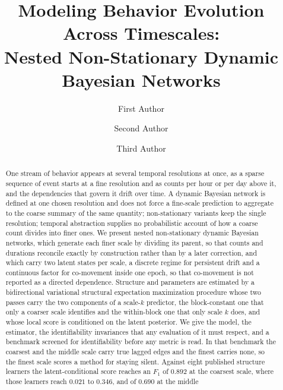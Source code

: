 \documentclass[letterpaper,10pt]{article}
\begin{document}
\title{
    Modeling Behavior Evolution Across Timescales:\\
    Nested Non-Stationary Dynamic Bayesian Networks
}

\author[1,$*$,$\dagger$]{First Author}
\author[1,2,$*$]{Second Author}
\author[2]{Third Author}


\maketitle

\begin{abstract}
One stream of behavior appears at several temporal resolutions at once, as a
sparse sequence of event starts at a fine resolution and as counts per hour or
per day above it, and the dependencies that govern it drift over time. A
dynamic Bayesian network is defined at one chosen resolution and does not force
a fine-scale prediction to aggregate to the coarse summary of the same
quantity; non-stationary variants keep the single resolution; temporal
abstraction supplies no probabilistic account of how a coarse count divides
into finer ones. We present nested non-stationary dynamic Bayesian networks,
which generate each finer scale by dividing its parent, so that counts and
durations reconcile exactly by construction rather than by a later correction,
and which carry two latent states per scale, a discrete regime for persistent
drift and a continuous factor for co-movement inside one epoch, so that
co-movement is not reported as a directed dependence. Structure and parameters
are estimated by a bidirectional variational structural expectation maximization
procedure whose two passes carry the two components of a scale-\(k\) predictor,
the block-constant one that only a coarser scale identifies and the within-block
one that only scale \(k\) does, and whose local score is conditioned on the
latent posterior. We give the
model, the estimator, the identifiability invariances that any evaluation of it
must respect, and a benchmark screened for identifiability before any metric is
read. In that benchmark the coarsest and the middle scale carry true lagged
edges and the finest carries none, so the finest scale scores a method for
staying silent. Against eight published structure learners the
latent-conditional score reaches an $F_1$ of $0.892$ at the coarsest scale,
where those learners reach $0.021$ to $0.346$, and of $0.690$ at the middle

\end{abstract}
\end{document}
